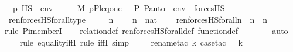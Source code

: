 \begin{isabellebody}
\ \ {\isachardoublequoteopen}p\ {\isasymtturnstile}HS\ {\isasymphi}\ env\ \ \ {\isasymequiv}\ \ \ M{\isacharcomma}{\kern0pt}\ {\isacharparenleft}{\kern0pt}{\isacharbrackleft}{\kern0pt}p{\isacharcomma}{\kern0pt}P{\isacharcomma}{\kern0pt}leq{\isacharcomma}{\kern0pt}one{\isacharcomma}{\kern0pt}\ {\isasymlangle}{\isasymF}{\isacharcomma}{\kern0pt}\ {\isasymG}{\isacharcomma}{\kern0pt}\ P{\isacharcomma}{\kern0pt}\ P{\isacharunderscore}{\kern0pt}auto{\isasymrangle}{\isacharbrackright}{\kern0pt}\ {\isacharat}{\kern0pt}\ env{\isacharparenright}{\kern0pt}\ {\isasymTurnstile}\ forcesHS{\isacharparenleft}{\kern0pt}{\isasymphi}{\isacharparenright}{\kern0pt}{\isachardoublequoteclose}\isanewline
\isanewline
{}\isamarkupfalse%
\ ren{\isacharunderscore}{\kern0pt}forcesHS{\isacharunderscore}{\kern0pt}forall{\isacharunderscore}{\kern0pt}type\ {\isacharcolon}{\kern0pt}\ \isanewline
\ \ \ n\ \isanewline
\ \ \ {\isachardoublequoteopen}n\ {\isasymin}\ nat{\isachardoublequoteclose}\ \isanewline
\ \ \ {\isachardoublequoteopen}ren{\isacharunderscore}{\kern0pt}forcesHS{\isacharunderscore}{\kern0pt}forall{\isacharparenleft}{\kern0pt}n{\isacharparenright}{\kern0pt}\ {\isasymin}\ {\isacharparenleft}{\kern0pt}{}{\isasymunion}n{\isacharparenright}{\kern0pt}\ {\isasymrightarrow}\ {\isacharparenleft}{\kern0pt}{}{\isasymunion}n{\isacharparenright}{\kern0pt}{\isachardoublequoteclose}\ \isanewline
%
\isadelimproof
\isanewline
\ \ %
\endisadelimproof
%
\isatagproof
{}\isamarkupfalse%
{\isacharparenleft}{\kern0pt}rule\ Pi{\isacharunderscore}{\kern0pt}memberI{\isacharparenright}{\kern0pt}\isanewline
\ \ \isamarkupfalse%
\ relation{\isacharunderscore}{\kern0pt}def\ ren{\isacharunderscore}{\kern0pt}forcesHS{\isacharunderscore}{\kern0pt}forall{\isacharunderscore}{\kern0pt}def\ function{\isacharunderscore}{\kern0pt}def\ \isanewline
\ \ \ \ \ \isamarkupfalse%
\ auto{\isacharbrackleft}{\kern0pt}{}{\isacharbrackright}{\kern0pt}\isanewline
\ \ \ \isamarkupfalse%
{\isacharparenleft}{\kern0pt}rule\ equality{\isacharunderscore}{\kern0pt}iffI{\isacharcomma}{\kern0pt}\ rule\ iffI{\isacharcomma}{\kern0pt}\ simp{\isacharparenright}{\kern0pt}\isanewline
\ \ \ \ \isamarkupfalse%
{\isacharparenleft}{\kern0pt}rename{\isacharunderscore}{\kern0pt}tac\ k{\isacharcomma}{\kern0pt}\ case{\isacharunderscore}{\kern0pt}tac\ {\isachardoublequoteopen}{}\ {\isasymle}\ k{\isachardoublequoteclose}{\isacharparenright}{\kern0pt}\isanewline

\end{isabellebody}
